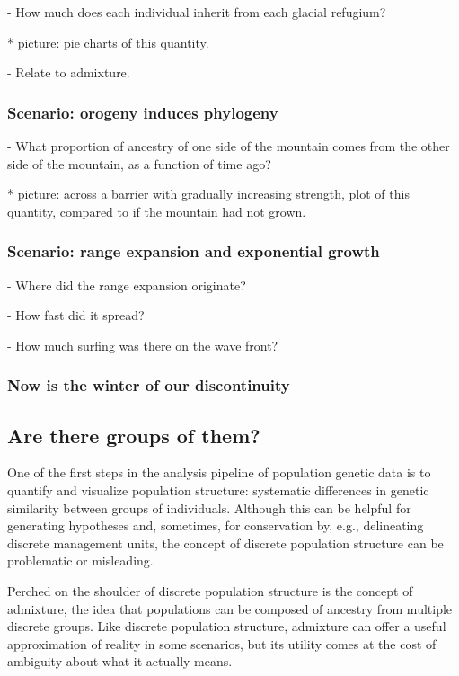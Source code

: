 \documentclass{ar-1col}
\begin{document}
        - How much does each individual inherit from each glacial refugium?

            * picture: pie charts of this quantity.

        - Relate to admixture.

\subsubsection{Scenario: orogeny induces phylogeny}

        - What proportion of ancestry of one side of the mountain comes from the other side of the mountain,
            as a function of time ago?

            * picture: across a barrier with gradually increasing strength,
                plot of this quantity, compared to if the mountain had not grown.

\subsubsection{Scenario: range expansion and exponential growth}

        - Where did the range expansion originate?

        - How fast did it spread?

        - How much surfing was there on the wave front?

\subsubsection{Now is the winter of our discontinuity}

\subsection{Are there groups of them?}
One of the first steps in the analysis pipeline of population genetic data 
is to quantify and visualize population structure:
systematic differences in genetic similarity between groups of individuals.
Although this can be helpful for generating hypotheses 
and, sometimes, for conservation by, e.g., delineating discrete management units, 
the concept of discrete population structure 
can be problematic or misleading.


Perched on the shoulder of discrete population structure is the concept of admixture, 
the idea that populations can be composed of ancestry from multiple discrete groups.
Like discrete population structure, 
admixture can offer a useful approximation of reality in some scenarios, 
but its utility comes at the cost of ambiguity about what it actually means.
\end{document}
